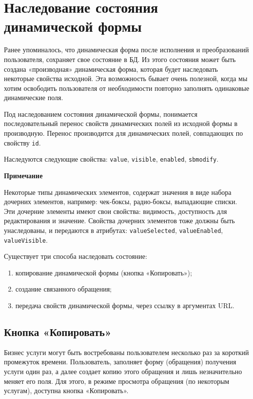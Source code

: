 \documentclass[../index.tex]{subfiles}
\begin{document}
\section{Наследование состояния\\динамической формы}
Ранее упоминалось, что динамическая форма после исполнения и преобразований пользователя,
сохраняет свое состояние в БД. Из этого состояния может быть создана «производная» динамическая форма,
которая будет наследовать некоторые свойства исходной. Эта возможность бывает очень полезной,
когда мы хотим освободить пользователя от необходимости повторно заполнять одинаковые динамические поля.

Под наследованием состояния динамической формы, понимается последовательный перенос свойств динамических полей
из исходной формы в производную. Перенос производится для динамических полей, совпадающих по свойству \verb|id|.

Наследуются следующие свойства: \verb|value|, \verb|visible|, \verb|enabled|, \verb|sbmodify|.

\textbf{Примечание}

Некоторые типы динамических элементов, содержат значения в виде набора дочерних элементов,
например: чек-боксы, радио-боксы, выпадающие списки. Эти дочерние элементы имеют свои
свойства: видимость, доступность для редактирования и значение.
Свойства дочерних элементов тоже должны быть унаследованы, и передаются в
атрибутах: \verb|valueSelected|, \verb|valueEnabled|, \verb|valueVisible|.

Существует три способа наследовать состояние:

\begin{enumerate}
	\item копирование динамической формы (кнопка «Копировать»);
	\item создание связанного обращения;
    \item передача свойств динамической формы, через ссылку в аргументах URL.
\end{enumerate}

\subsection{Кнопка «Копировать»}
Бизнес услуги могут быть востребованы пользователем несколько раз за короткий промежуток времени.
Пользователь, заполняет форму (обращения) получения услуги один раз, а далее создает копию этого обращения
и лишь незначительно меняет его поля. Для этого, в режиме просмотра обращения (по некоторым услугам),
доступна кнопка «Копировать».
\end{document}
